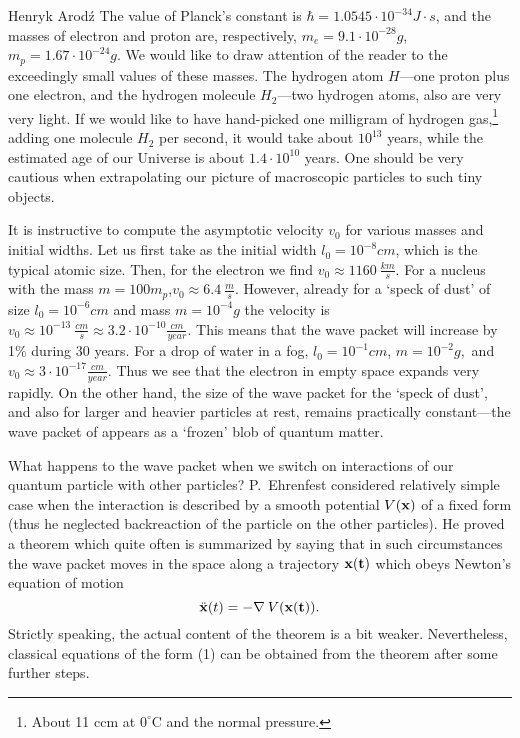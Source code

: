 \begin{artengenv}{Henryk Arod\'z}
 The value of Planck's constant is
$\hbar = 1.0545 \cdot 10^{-34} J \cdot s$, and the masses of electron and proton are, respectively, $m_e= 9.1 \cdot 10^{-28} g$,
$m_p = 1.67 \cdot 10^{-24} g $. We would like to draw attention of the reader to the exceedingly small values of these masses. The hydrogen atom $H$---one proton plus one electron, and the hydrogen molecule $H_2$---two hydrogen atoms, also are very very light. If we would like to have hand-picked one milligram of hydrogen gas,\footnote{About 11 ccm at $0^{\circ}$C and the normal pressure.} adding one molecule $H_2$ per second, it would take about $10^{13}$ years, while the estimated age of our Universe is about $1.4 \cdot 10^{10}$ years. One should be very cautious when extrapolating our picture of macroscopic particles to such tiny objects.

It is instructive to compute the asymptotic velocity $v_0$ for various masses and initial widths. 
Let us first take as the initial width $l_0 = 10^{-8} cm $, which is the typical atomic size. Then, for the electron we find 
 $v_0 \approx 1160 \: \frac{km}{s}.$ For a nucleus with the mass
\mbox{$m= 100 m_p$,}\linebreak[4]
\mbox{$v_0 \approx 6.4 \: \frac{m}{s}$.}
 However, already for a `speck of dust' of size
 \mbox{$l_0=10^{-6} cm$}
 and mass 
 $m=10^{-4} g$ the velocity is $v_0 \approx 10^{-13} \: \frac{cm}{s} \approx 3.2 \cdot 10^{-10} \frac{cm}{year}.$ This means that the wave packet will increase by 1\% during 30 years. For a drop of water in a fog, $l_0 = 10^{-1} cm$, $m=10^{-2}g,$ and $v_0\approx 3\cdot 10^{-17} \frac{cm}{year}$. Thus we see that the electron in empty space expands very rapidly. On the other hand, the size of the wave packet for the `speck of dust', and also for larger and heavier particles at rest, remains practically constant---the wave packet of appears as a `frozen' blob of quantum matter. 


What happens to the wave packet when we switch on interactions of our quantum particle with other particles? P.~Ehrenfest considered relatively simple case when the interaction is described by a smooth potential $V(\bf{x})$ of a fixed form (thus he neglected backreaction of the particle on the other particles). He proved a theorem which quite often is summarized by saying that in such circumstances the wave packet moves in the space along a trajectory $\bf{x}(t)$ which obeys Newton's equation of motion
\begin{equation} \ddot{\bf{x}}(t) = - \nabla \:V(\bf{x}(t)). \end{equation} 
Strictly speaking, the actual content of the theorem is a bit weaker. Nevertheless, classical equations of the form (1) can be obtained from the theorem after some further steps. 



\end{artengenv}
